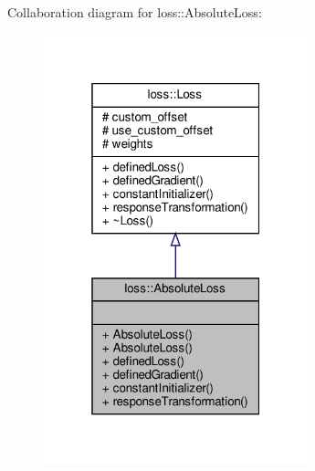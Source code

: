Collaboration diagram for loss\+:\+:Absolute\+Loss\+:
\nopagebreak
\begin{figure}[H]
\begin{center}
\leavevmode
\includegraphics[width=217pt]{classloss_1_1_absolute_loss__coll__graph}
\end{center}
\end{figure}

